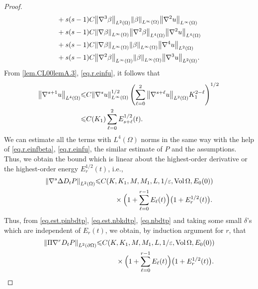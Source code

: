 \documentclass[12pt,reqno]{amsart}
\numberwithin{equation}{section}
\theoremstyle{definition}
\theoremstyle{remark}
\begin{document}
\begin{proof}
\begin{align}
  &+s(s-1)C{\left\Vert{{\nabla}^3 \beta}\right\Vert}_{L^2(\Omega)}{\left\Vert{\beta}\right\Vert}_{L^\infty(\Omega)} {\left\Vert{{\nabla}^{2} u}\right\Vert}_{L^\infty(\Omega)}{\nonumber}\\
  &+s(s-1)C{\left\Vert{{\nabla} \beta}\right\Vert}_{L^\infty(\Omega)}{\left\Vert{{\nabla}^2\beta}\right\Vert}_{L^4(\Omega)} {\left\Vert{{\nabla}^{2} u}\right\Vert}_{L^4(\Omega)}{\nonumber}\\
  &+s(s-1)C{\left\Vert{{\nabla} \beta}\right\Vert}_{L^\infty(\Omega)}{\left\Vert{\beta}\right\Vert}_{L^\infty(\Omega)} {\left\Vert{{\nabla}^4 u}\right\Vert}_{L^2(\Omega)}{\nonumber}\\
  &+s(s-1)C{\left\Vert{{\nabla}^2 \beta}\right\Vert}_{L^\infty(\Omega)}{\left\Vert{\beta}\right\Vert}_{L^\infty(\Omega)} {\left\Vert{{\nabla}^3 u}\right\Vert}_{L^2(\Omega)}.
\end{align}
From \eqref{lem.CL00lemA.3}, \eqref{eq.r.einfu}, it follows that
\begin{align}
  {\left\Vert{{\nabla}^{s+1} u}\right\Vert}_{L^4(\Omega)}{\leqslant}& C{\left\Vert{{\nabla}^s u}\right\Vert}_{L^\infty(\Omega)}^{1/2}\left(\sum_{\ell=0}^2{\left\Vert{{\nabla}^{s+\ell} u}\right\Vert}_{L^2(\Omega)}K_1^{2-\ell}\right)^{1/2}{\nonumber}\\
  {\leqslant}& C(K_1)\sum_{\ell=0}^2 E_{s+\ell}^{1/2}(t).
\end{align}
We can estimate all the terms with $L^4(\Omega)$ norms in the same way with the help of \eqref{eq.r.einfbeta}, \eqref{eq.r.einfu}, the similar estimate of ${P }$ and the assumptions. Thus, we obtain the bound which is linear about the highest-order derivative or the highest-order energy $E_r^{1/2}(t)$, i.e.,
\begin{align}\label{eq.nbdtp}
  {\left\Vert{{\nabla}^s\Delta D_t{P }}\right\Vert}_{L^2(\Omega)}{\leqslant}& C(K,K_1,M,M_1,L,1/{\varepsilon},{\mathrm{Vol}\,}\Omega,E_0(0)){\nonumber}\\
   &\qquad\times\Big(1+\sum_{\ell=0}^{r-1}E_\ell(t)\Big)\big(1+E_r^{1/2}(t)\big).
\end{align}
Thus, from \eqref{eq.est.pinbdtp}, \eqref{eq.est.nbkdtp}, \eqref{eq.nbdtp} and taking some small $\delta$'s which are independent of $E_r(t)$, we obtain, by induction argument for $r$, that
\begin{align}\label{eq.pinbrdtp}
  {\left\Vert{\Pi {\nabla}^r D_t{P }}\right\Vert}_{L^2({\partial}\Omega)}{\leqslant} &C(K,K_1,M,M_1,L,1/{\varepsilon},{\mathrm{Vol}\,}\Omega,E_0(0)){\nonumber}\\
   &\qquad\times\Big(1+\sum_{\ell=0}^{r-1}E_\ell(t)\Big)\big(1+E_r^{1/2}(t)\big).
\end{align}


\end{proof}
\end{document}
